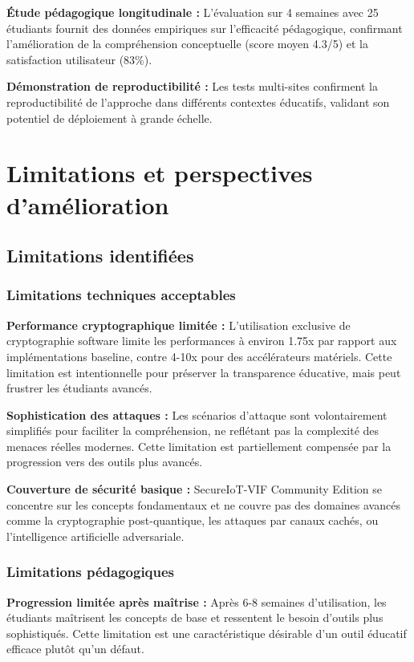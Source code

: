 \textbf{Étude pédagogique longitudinale :} L'évaluation sur 4 semaines avec 25 étudiants fournit des données empiriques sur l'efficacité pédagogique, confirmant l'amélioration de la compréhension conceptuelle (score moyen 4.3/5) et la satisfaction utilisateur (83\%).

\textbf{Démonstration de reproductibilité :} Les tests multi-sites confirment la reproductibilité de l'approche dans différents contextes éducatifs, validant son potentiel de déploiement à grande échelle.

\section{Limitations et perspectives d'amélioration}

\subsection{Limitations identifiées}

\subsubsection{Limitations techniques acceptables}

\textbf{Performance cryptographique limitée :} L'utilisation exclusive de cryptographie software limite les performances à environ 1.75x par rapport aux implémentations baseline, contre 4-10x pour des accélérateurs matériels. Cette limitation est intentionnelle pour préserver la transparence éducative, mais peut frustrer les étudiants avancés.

\textbf{Sophistication des attaques :} Les scénarios d'attaque sont volontairement simplifiés pour faciliter la compréhension, ne reflétant pas la complexité des menaces réelles modernes. Cette limitation est partiellement compensée par la progression vers des outils plus avancés.

\textbf{Couverture de sécurité basique :} SecureIoT-VIF Community Edition se concentre sur les concepts fondamentaux et ne couvre pas des domaines avancés comme la cryptographie post-quantique, les attaques par canaux cachés, ou l'intelligence artificielle adversariale.

\subsubsection{Limitations pédagogiques}

\textbf{Progression limitée après maîtrise :} Après 6-8 semaines d'utilisation, les étudiants maîtrisent les concepts de base et ressentent le besoin d'outils plus sophistiqués. Cette limitation est une caractéristique désirable d'un outil éducatif efficace plutôt qu'un défaut.

